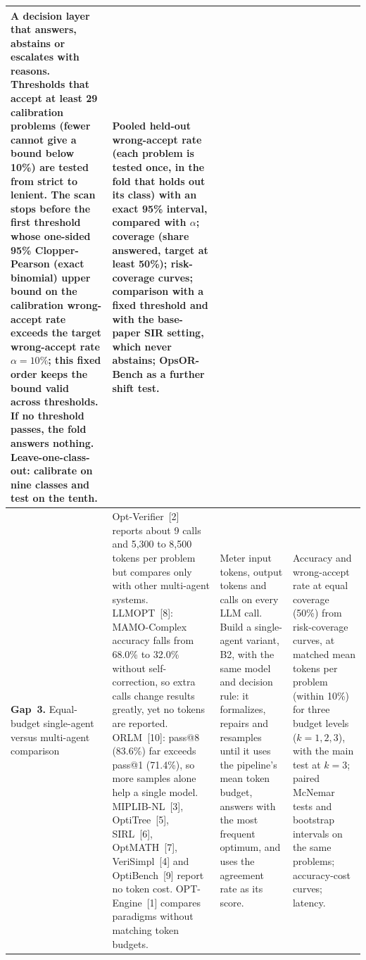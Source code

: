 \documentclass[11pt,a4paper]{article}
\begin{document}
{\begin{xltabular}{\textwidth}{@{}P{2.0cm}>{\raggedright\arraybackslash{}\hsize}X>{\raggedright\arraybackslash{}\hsize}X>{\raggedright\arraybackslash{}\hsize}X@{}}
A decision layer that answers, abstains or escalates with reasons. Thresholds that accept at least 29 calibration problems (fewer cannot give a bound below 10\%) are tested from strict to lenient. The scan stops before the first threshold whose one-sided 95\% Clopper-Pearson (exact binomial) upper bound on the calibration wrong-accept rate exceeds the target wrong-accept rate $\alpha = 10\%$; this fixed order keeps the bound valid across thresholds. If no threshold passes, the fold answers nothing. Leave-one-class-out: calibrate on nine classes and test on the tenth. &
Pooled held-out wrong-accept rate (each problem is tested once, in the fold that holds out its class) with an exact 95\% interval, compared with $\alpha$; coverage (share answered, target at least 50\%); risk-coverage curves; comparison with a fixed threshold and with the base-paper SIR setting, which never abstains; OpsOR-Bench as a further shift test.\\
\midrule
\textcolor{gapthree}{\textbf{Gap~3.}} Equal-budget single-agent versus multi-agent comparison &
Opt-Verifier~[2] reports about 9 calls and 5,300 to 8,500 tokens per problem but compares only with other multi-agent systems. LLMOPT~[8]: MAMO-Complex accuracy falls from 68.0\% to 32.0\% without self-correction, so extra calls change results greatly, yet no tokens are reported. ORLM~[10]: pass@8 (83.6\%) far exceeds pass@1 (71.4\%), so more samples alone help a single model. MIPLIB-NL~[3], OptiTree~[5], SIRL~[6], OptMATH~[7], VeriSimpl~[4] and OptiBench~[9] report no token cost. OPT-Engine~[1] compares paradigms without matching token budgets. &
Meter input tokens, output tokens and calls on every LLM call. Build a single-agent variant, B2, with the same model and decision rule: it formalizes, repairs and resamples until it uses the pipeline's mean token budget, answers with the most frequent optimum, and uses the agreement rate as its score. &
Accuracy and wrong-accept rate at equal coverage (50\%) from risk-coverage curves, at matched mean tokens per problem (within 10\%) for three budget levels ($k = 1, 2, 3$), with the main test at $k = 3$; paired McNemar tests and bootstrap intervals on the same problems; accuracy-cost curves; latency.\\
\end{xltabular}
}
\end{document}
